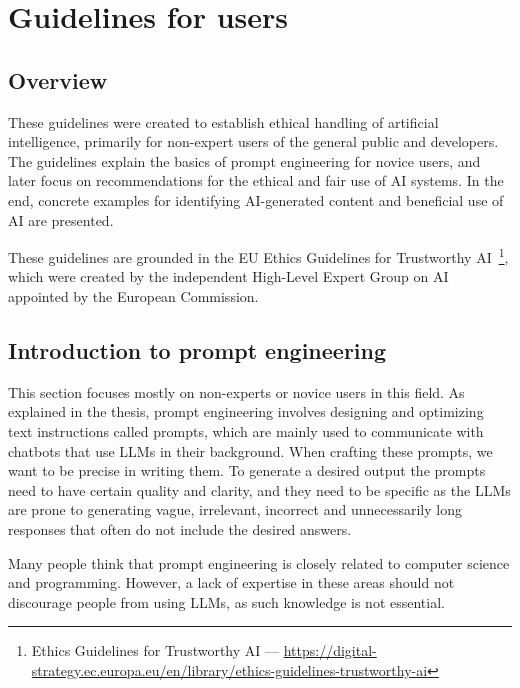 \setcounter{figure}{0}
\setcounter{table}{0}
\setcounter{section}{0}
\setcounter{listing}{0}

\chapter{Guidelines for users \label{cha:guidelines}}
\renewcommand{\thepage}{B-\arabic{page}}


\minitoc
\clearpage

\section{Overview}
These guidelines were created to establish ethical handling of artificial intelligence, primarily for non-expert users of the general public and developers. The guidelines explain the basics of prompt engineering for novice users, and later focus on recommendations for the ethical and fair use of AI systems. In the end, concrete examples for identifying AI-generated content and beneficial use of AI are presented.

These guidelines are grounded in the EU Ethics Guidelines for Trustworthy AI~\footnote{Ethics Guidelines for Trustworthy AI --- \url{https://digital-strategy.ec.europa.eu/en/library/ethics-guidelines-trustworthy-ai}}, which were created by the independent High-Level Expert Group on AI appointed by the European Commission.

\section{Introduction to prompt engineering}
This section focuses mostly on non-experts or novice users in this field. As explained in the thesis, prompt engineering involves designing and optimizing text instructions called prompts, which are mainly used to communicate with chatbots that use LLMs in their background. When crafting these prompts, we want to be precise in writing them. To generate a desired output the prompts need to have certain quality and clarity, and they need to be specific as the LLMs are prone to generating vague, irrelevant, incorrect and unnecessarily long responses that often do not include the desired answers.

Many people think that prompt engineering is closely related to computer science and programming. However, a lack of expertise in these areas should not discourage people from using LLMs, as such knowledge is not essential.

